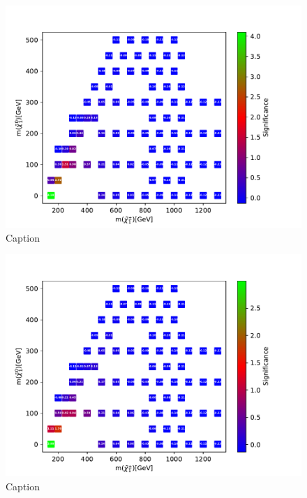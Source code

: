 \begin{figure}
    \centering
    \includegraphics[width = \textwidth]{Figures/Significances/significance_BDT_slepsnu_High_level.pdf}
    \caption{Caption}
    \label{fig:my_label}
\end{figure}



\begin{figure}
    \centering
    \includegraphics[width = \textwidth]{Figures/Significances/significance_NN_slepsnu_All_level.pdf}
    \caption{Caption}
    \label{fig:my_label}
\end{figure}

